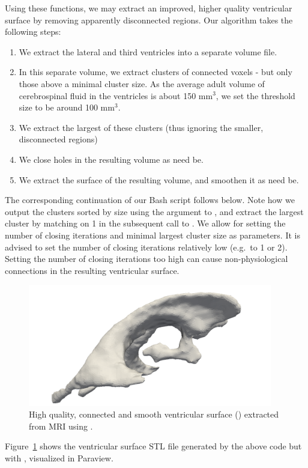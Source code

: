 Using these functions, we may extract an improved, higher quality
ventricular surface by removing apparently disconnected regions. Our
algorithm takes the following steps:
\begin{enumerate}
\item
  We extract the lateral and third ventricles into a separate volume
  file.
\item
  In this separate volume, we extract clusters of connected voxels -
  but only those above a minimal cluster size. As the average adult
  volume of cerebrospinal fluid in the ventricles is about 150
  mm$^{3}$, we set the threshold size to be around 100 mm$^3$.
\item
  We extract the largest of these clusters (thus ignoring the smaller,
  disconnected regions)
\item
  We close holes in the resulting volume as need be.
\item
  We extract the surface of the resulting volume, and smoothen it as
  need be.
\end{enumerate}
The corresponding continuation of our Bash script follows below. Note
how we output the clusters sorted by size using the argument
 to , and extract the largest
cluster by matching on 1 in the subsequent call to
. We allow for setting the number of closing
iterations  and minimal largest cluster size
 as parameters. It is advised to set the number of closing
iterations relatively low (e.g.~to 1 or 2). Setting the number of closing
iterations too high can cause non-physiological connections in the
resulting ventricular surface.


\begin{figure}%
  \centering
  \includegraphics[width=0.95\textwidth]{./chapters/chp4/FIG/ernie-ventricles-final.png}
  \caption{High quality, connected and smooth ventricular surface
    () extracted from MRI using
    \freesurfer{}. }
  \label{fig:chp4:ernie-ventricles-final}
\end{figure}
\noindent Figure~\ref{fig:chp4:ernie-ventricles-final} shows the ventricular
surface STL file generated by the above code but with
, visualized in Paraview.

